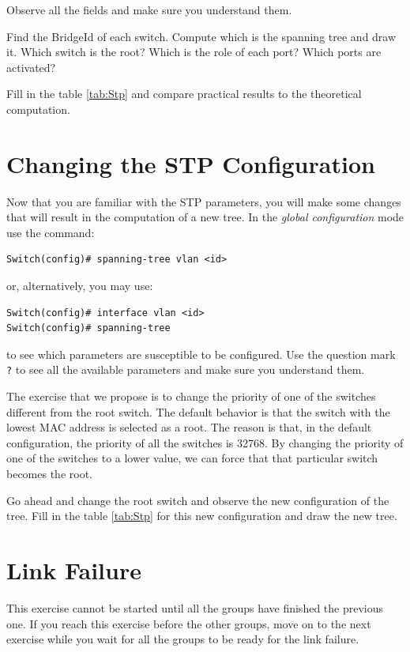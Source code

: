 Observe all the fields and make sure you understand them.

{\color{red}Find the BridgeId of each switch.
Compute which is the spanning tree and draw it.
Which switch is the root?
Which is the role of each port?
Which ports are activated?

Fill in the table \ref{tab:Stp} and compare practical results to the theoretical computation.}

\section{Changing the STP Configuration}

Now that you are familiar with the STP parameters, you will make some changes that will result in the computation of a new tree. In the \emph{global configuration} mode use the command:

\begin{lstlisting}
Switch(config)# spanning-tree vlan <id>
\end{lstlisting}
or, alternatively, you may use:

\begin{lstlisting}
Switch(config)# interface vlan <id>
Switch(config)# spanning-tree
\end{lstlisting}
to see which parameters are susceptible to be configured. Use the question mark \texttt{\color{blue}?} to see all the available parameters and make sure you understand them.

The exercise that we propose is to change the priority of one of the switches different from the root switch. The default behavior is that the switch with the lowest MAC address is selected as a root. The reason is that, in the default configuration, the priority of all the switches is 32768. By changing the priority of one of the switches to a lower value, we can force that that particular switch becomes the root.

Go ahead and change the root switch and observe the new configuration of the tree. Fill in the table \ref{tab:Stp} for this new configuration and draw the new tree.

\section{Link Failure}

This exercise cannot be started until all the groups have finished the previous one. If you reach this exercise before the other groups, move on to the next exercise while you wait for all the groups to be ready for the link failure.

